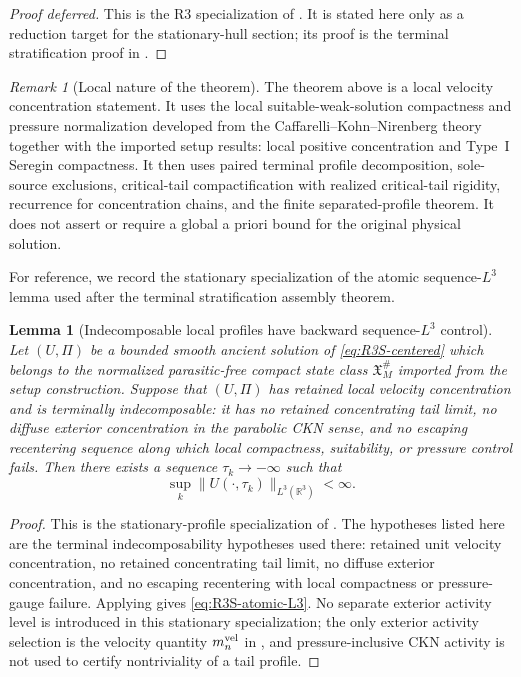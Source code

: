\documentclass[11pt]{amsart}
\numberwithin{equation}{section}
\theoremstyle{plain}
\newtheorem{lemma}[lemma]{Lemma}
\theoremstyle{definition}
\theoremstyle{remark}
\newtheorem{remark}[remark]{Remark}
\begin{document}
\begin{proof}[Proof deferred]
This is the R3 specialization of
.  It is stated here only as a
reduction target for the stationary-hull section; its proof is the terminal
stratification proof in
.
\end{proof}

\begin{remark}[Local nature of the theorem]
\label{rem:R3S-local-nature}
The theorem above is a local velocity concentration statement.  It uses the local
suitable-weak-solution compactness and pressure normalization developed from
the Caffarelli--Kohn--Nirenberg theory \cite{CKN1982} together with the
imported setup results: local positive concentration
and Type~I Seregin compactness.  It then uses paired terminal
profile decomposition, sole-source exclusions, critical-tail compactification
with realized critical-tail rigidity, recurrence for concentration chains, and the
finite separated-profile theorem.  It does not assert or require a global a
priori bound for the original physical solution.
\end{remark}

For reference, we record the stationary specialization of the atomic
sequence-\(L^3\) lemma used after the terminal stratification assembly theorem.

\begin{lemma}[Indecomposable local profiles have backward sequence-\(L^3\) control]
\label{lem:R3S-atomic-L3}
Let \((U,\Pi)\) be a bounded smooth ancient solution of
\eqref{eq:R3S-centered} which belongs to the normalized parasitic-free compact
state class \(\mathfrak X_M^\#\) imported from the setup construction.  Suppose
that \((U,\Pi)\) has retained local velocity concentration and is terminally
indecomposable: it has no retained
concentrating tail limit, no diffuse exterior concentration in the parabolic
CKN sense, and no escaping recentering sequence along which local compactness,
suitability, or pressure control fails.  Then there
exists a sequence \(\tau_k\to-\infty\) such that
\begin{equation}\label{eq:R3S-atomic-L3}
   \sup_k \|U(\cdot,\tau_k)\|_{L^3(\mathbb R^3)}<\infty .
\end{equation}
\end{lemma}

\begin{proof}
This is the stationary-profile specialization of
.  The hypotheses listed here are the
terminal indecomposability hypotheses used there: retained unit velocity concentration, no
retained concentrating tail limit, no diffuse exterior concentration, and no
escaping recentering with local compactness or pressure-gauge failure.  Applying
 gives \eqref{eq:R3S-atomic-L3}.  No separate
exterior activity level is introduced in this stationary specialization; the
only exterior activity selection is the velocity quantity \(m_n^{\rm vel}\) in
, and pressure-inclusive CKN activity is not used
to certify nontriviality of a tail profile.
\end{proof}
\end{document}

